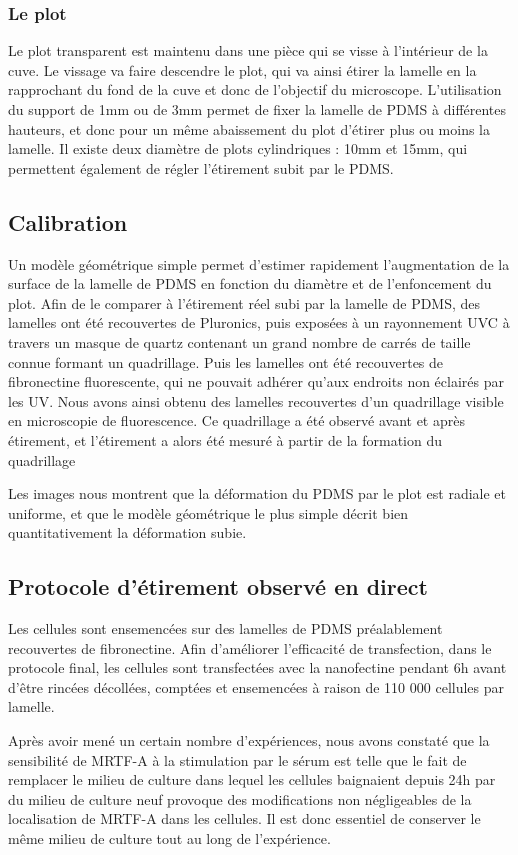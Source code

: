 \documentclass{report}
\begin{document}
	\subsubsection{Le plot}
	Le plot transparent est maintenu dans une pièce qui se visse à l'intérieur de la cuve. Le vissage va faire descendre le plot, qui va ainsi étirer la lamelle en la rapprochant du fond de la cuve et donc de l'objectif du microscope. 
	L'utilisation du support de 1mm ou de 3mm permet de fixer la lamelle de PDMS à différentes hauteurs, et donc pour un même abaissement du plot d'étirer plus ou moins la lamelle. Il existe deux diamètre de plots cylindriques : 10mm et 15mm, qui permettent également de régler l'étirement subit par le PDMS. 
	\subsection{Calibration}
	
	Un modèle géométrique simple permet d'estimer rapidement l'augmentation de la surface de la lamelle de PDMS en fonction du diamètre et de l'enfoncement du plot. Afin de le comparer à l'étirement réel subi par la lamelle de PDMS, des lamelles ont été recouvertes de Pluronics, puis exposées à un rayonnement UVC à travers un masque de quartz contenant un grand nombre de carrés de taille connue formant un quadrillage. Puis les lamelles ont été recouvertes de fibronectine fluorescente, qui ne pouvait adhérer qu'aux endroits non éclairés par les UV. 
	Nous avons ainsi obtenu des lamelles recouvertes d'un quadrillage visible en microscopie de fluorescence. Ce quadrillage a été observé avant et après étirement, et l'étirement a alors été mesuré à partir de la formation du quadrillage
	
	Les images nous montrent que la déformation du PDMS par le plot est radiale et uniforme, et que le modèle géométrique le plus simple décrit bien quantitativement la déformation subie. 
	
	\subsection{Protocole d'étirement observé en direct}
	Les cellules sont ensemencées sur des lamelles de PDMS préalablement recouvertes de fibronectine. Afin d'améliorer l'efficacité de transfection, dans le protocole final, les cellules sont transfectées avec la nanofectine pendant 6h avant d'être rincées décollées, comptées et ensemencées à raison de 110 000 cellules par lamelle. 
	
	Après avoir mené un certain nombre d'expériences, nous avons constaté que la sensibilité de MRTF-A à la stimulation par le sérum est telle que le fait de remplacer le milieu de culture dans lequel les cellules baignaient depuis 24h par du milieu de culture neuf provoque des modifications non négligeables de la localisation de MRTF-A dans les cellules. Il est donc essentiel de conserver le même milieu de culture tout au long de l'expérience. 
	
\end{document}
